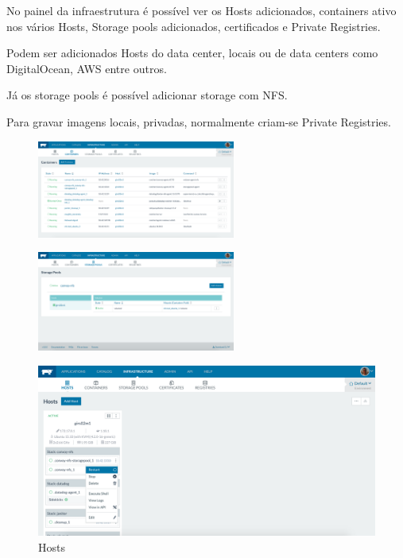 \documentclass[pdftex,12pt,a4paper]{report}
\begin{document}
No painel da infraestrutura é possível ver os Hosts adicionados, containers ativo nos vários Hosts, Storage pools adicionados, certificados e Private Registries.

Podem ser adicionados Hosts do data center, locais ou de data centers como DigitalOcean, AWS entre outros.

Já os storage pools é possível adicionar storage com NFS.

Para gravar imagens locais, privadas, normalmente criam-se Private Registries.

\begin{figure}[!htb]
\centering
\begin{minipage}{.5\textwidth}
  \centering
  \includegraphics[width=65mm,scale=1]{imagens/containers.png}
  \label{fig:containers}
\end{minipage}%
\begin{minipage}{.5\textwidth}
  \centering
  \includegraphics[width=65mm,scale=1]{imagens/storage_pools.png}
  \label{fig:storage_pools}
\end{minipage}
\end{figure}


\begin{figure}[!htb]
\center
 \includegraphics[width=150mm,scale=1]{imagens/hosts_menu.png}
 \caption{Hosts}
 \label{fig:hosts_menu}
\end{figure}
\end{document}
